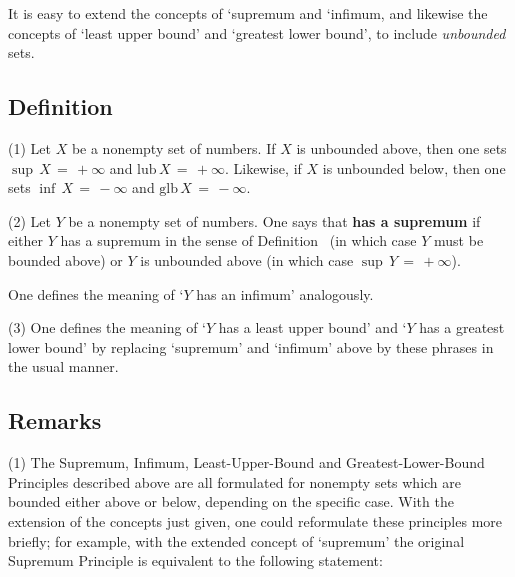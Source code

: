 \V

    It is easy to extend the concepts of `supremum and `infimum, and likewise the concepts of `least upper bound' and `greatest lower bound',
    to include {\em unbounded} sets.

            \subsection{\small{\bf Definition}}
            \label{DefB30.08K}

\V

\hspace*{\parindent} (1) Let $X$ be a nonempty set of numbers. If $X$ is unbounded above, then one sets ${\sup}\,X \,=\, +{\infty}$ and $\mbox{lub}\,X \,=\, +{\infty}$.
    Likewise, if $X$ is unbounded below, then one sets ${\inf}\,X \,=\, -{\infty}$ and $\mbox{glb}\,X \,=\, -{\infty}$.

\V

        (2) Let $Y$ be a nonempty set of numbers. One says that {\bf {} has a supremum}
    if either $Y$ has a supremum in the sense of Definition~ (in which case $Y$ must be bounded above)
    or $Y$ is unbounded above (in which case ${\sup}\,Y \,=\, +{\infty}$).

        One defines the meaning of `$Y$ has an infimum' analogously.

\V

        (3) One defines the meaning of `$Y$ has a least upper bound' and `$Y$ has a greatest lower bound'
    by replacing `supremum' and `infimum' above by these phrases in the usual manner.

\VV
            \subsection{\small{\bf Remarks}}
            \label{RemrkB30.08LL}

\V

        \hspace*{\parindent}(1) The Supremum, Infimum, Least-Upper-Bound and Greatest-Lower-Bound Principles described above
    are all formulated for nonempty sets which are bounded either above or below, depending on the specific case.
    With the extension of the concepts just given, one could reformulate these principles more briefly;
    for example, with the extended concept of `supremum' the original Supremum Principle is equivalent to the following statement:

